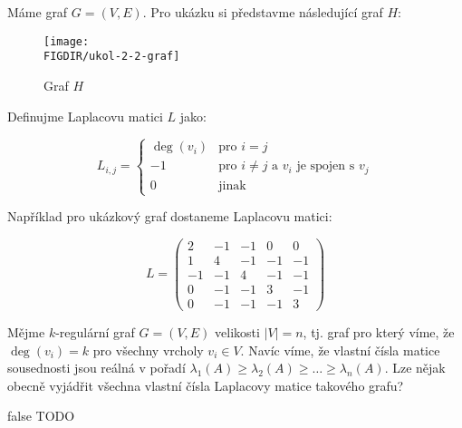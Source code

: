 \documentclass[10pt, a4paper]{ReportSheet}
\begin{document}
    \begin{uloha}{2}{2}{
        Máme graf $G = (V, E)$. Pro ukázku si představme následující graf $H$:

        \begin{figure}[H]
            \centering
            \texttt{[image: \\FIGDIR/ukol-2-2-graf]}
            \caption{Graf $H$}
            \label{fig:ukol-2-2-graf}
        \end{figure}

        Definujme Laplacovu matici $L$ jako:

        \begin{equation*}
            L_{i,j} = \begin{cases}
                          \deg(v_i) & \text{pro } i = j \\
                          -1 & \text{pro } i \ne j \text{ a } v_i \text{ je spojen s } v_j \\
                          0 & \text{jinak}
            \end{cases}
        \end{equation*}

        Například pro ukázkový graf dostaneme Laplacovu matici:

        \begin{equation*}
            L = \begin{pmatrix}
                    2  & -1 & -1 & 0  & 0  \\
                    1  & 4  & -1 & -1 & -1 \\
                    -1 & -1 & 4  & -1 & -1 \\
                    0  & -1 & -1 & 3  & -1 \\
                    0  & -1 & -1 & -1 & 3
            \end{pmatrix}
        \end{equation*}

        Mějme $k$-regulární graf $G = (V, E)$ velikosti $|V| = n$, tj. graf pro který víme, že $\deg(v_i) = k$ pro
        všechny vrcholy $v_i \in V$. Navíc víme, že vlastní čísla matice sousednosti jsou reálná v pořadí $\lambda_1(A) \ge \lambda_2(A) \ge \ldots \ge \lambda_n(A)$. Lze nějak obecně vyjádřit všechna vlastní čísla Laplacovy matice takového grafu?
    }{false}
        TODO
    \end{uloha}
\end{document}
